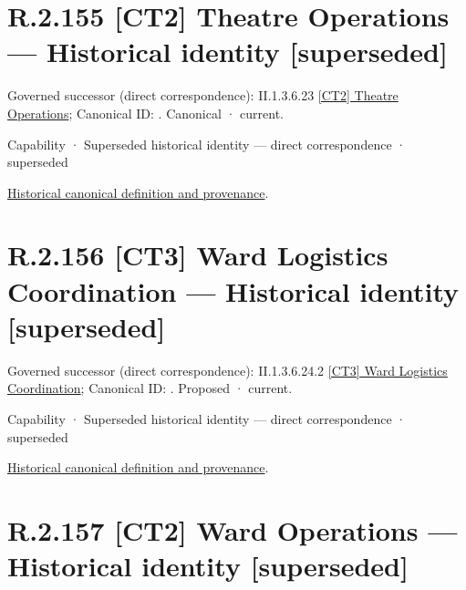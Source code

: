 \section*{R.2.155 [CT2] Theatre Operations — Historical identity [superseded]}
\label{navigation:R.2.155}

{\small Governed successor (direct correspondence): II.1.3.6.23 \hyperref[element:4bf7a8260e1444fdac44e97c3557b533]{[CT2] Theatre Operations}; Canonical ID: \texttt{}. Canonical · current.}\par
\label{element:9ac72fea821c45e2b18632ae9a9867dd}
{\small Capability · Superseded historical identity — direct correspondence · superseded}\par
\href{../../../../continuum/strategy/capability/9ac72fea821c45e2b18632ae9a9867dd.md}{Historical canonical definition and provenance}.\par
\section*{R.2.156 [CT3] Ward Logistics Coordination — Historical identity [superseded]}
\label{navigation:R.2.156}

{\small Governed successor (direct correspondence): II.1.3.6.24.2 \hyperref[element:3249647f7b9846c899f982ab339c81f9]{[CT3] Ward Logistics Coordination}; Canonical ID: \texttt{}. Proposed · current.}\par
\label{element:8a9dcc3b5f0143458ec71bc188a56020}
{\small Capability · Superseded historical identity — direct correspondence · superseded}\par
\href{../../../../continuum/strategy/capability/8a9dcc3b5f0143458ec71bc188a56020.md}{Historical canonical definition and provenance}.\par
\section*{R.2.157 [CT2] Ward Operations — Historical identity [superseded]}
\label{navigation:R.2.157}

